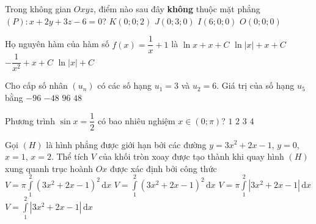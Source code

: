 \begin{ex}%
	Trong không gian $Oxyz$, điểm nào sau đây {\bf không} thuộc mặt phẳng $(P)\colon x+2y+3z-6=0$?
	\choice
	{$K(0;0;2)$}
	{$J(0;3;0)$}
	{$I(6;0;0)$}
	{\True $O(0;0;0)$}
\end{ex}

\begin{ex}%
	 Họ nguyên hàm của hàm số $f(x)=\dfrac{1}{x}+1$ là
\choice
{$\ln x+x+C$}
{\True $\ln |x|+x+C$}
{ $-\dfrac{1}{x^2}+x+C$}
{ $\ln |x|+C$}
\end{ex}
\begin{ex}%
	Cho cấp số nhân $(u_n)$ có các số hạng $u_1=3$ và $u_2=6$. Giá trị của số hạng $u_5$ bằng
	\choice
	{$-96$}
	{$-48$}
	{$96$}
	{\True $48$}
\end{ex}
\begin{ex}%
	Phương trình $\sin x=\dfrac{1}{2}$ có bao nhiêu nghiệm $x\in(0;\pi)$?
	\choice
	{$1$}
	{\True $2$}
	{$3$}
	{$4$}
\end{ex}
\begin{ex}%
	Gọi $(H)$ là hình phẳng được giới hạn bởi các đường $y=3x^2+2x-1$, $y=0$, $x=1$, $x=2$. Thể tích $V$ của khối tròn xoay được tạo thành khi quay hình $(H)$ xung quanh trục hoành $Ox$ được xác định bởi công thức
	\choice
	{\True $V=\pi \displaystyle\int\limits_1^2 \left(3x^2+2x-1\right)^2 \mathrm{\,d}x$}
	{$V=\displaystyle\int\limits_1^2 \left(3x^2+2x-1\right)^2 \mathrm{\,d}x$}
	{$V=\pi \displaystyle\int\limits_{1}^{2} \left| 3x^2+2x-1 \right| \mathrm{\,d}x$}
	{$V=\displaystyle\int\limits_{1}^{2} \left|3x^2+2x-1\right| \mathrm{\,d}x$}
\end{ex}
